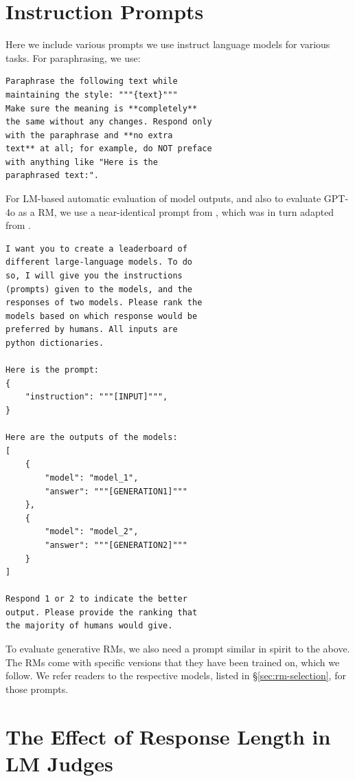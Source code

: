 \section{Instruction Prompts} \label{sec:instructions}

Here we include various prompts we use instruct language models for various tasks. For paraphrasing, we use:
\begin{verbatim}
Paraphrase the following text while
maintaining the style: """{text}"""
Make sure the meaning is **completely**
the same without any changes. Respond only
with the paraphrase and **no extra
text** at all; for example, do NOT preface
with anything like "Here is the
paraphrased text:".
\end{verbatim}

For LM-based automatic evaluation of model outputs,
and also to evaluate GPT-4o as a RM, 
we use a near-identical prompt from \citet{wu-etal-2024-reuse}, which was in turn adapted from \citet{alpaca_eval}.
\begin{verbatim}
I want you to create a leaderboard of
different large-language models. To do
so, I will give you the instructions
(prompts) given to the models, and the
responses of two models. Please rank the
models based on which response would be
preferred by humans. All inputs are
python dictionaries.

Here is the prompt:
{  
    "instruction": """[INPUT]""",
}

Here are the outputs of the models:
[   
    {  
        "model": "model_1",
        "answer": """[GENERATION1]"""
    },
    {  
        "model": "model_2",
        "answer": """[GENERATION2]"""
    }
]

Respond 1 or 2 to indicate the better
output. Please provide the ranking that
the majority of humans would give.
\end{verbatim}

To evaluate generative RMs, we also need a prompt similar in spirit to the above.
The RMs come with specific versions that they have been trained on, which we follow.
We refer readers to the respective models, listed in \S\ref{sec:rm-selection}, for those prompts.

\section{The Effect of Response Length in LM Judges} \label{sec:length-effect}

